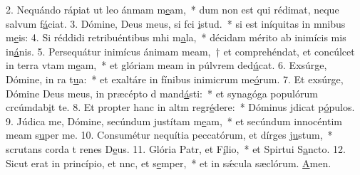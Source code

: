 2. Nequándo rápiat ut leo ánmam m\uline{e}am,~* dum non est qui rédimat, neque  salvum f\uline{á}ciat.
3. Dómine, Deus meus, si fci \uline{i}stud.~* si est iníquitas in mnibus m\uline{e}is:
4. Si réddidi retribuéntibus mhi m\uline{a}la,~* décidam mérito ab inimícis mis in\uline{á}nis.
5. Persequátur inimícus ánimam meam,~† et comprehéndat, et concúlcet in terra vtam m\uline{e}am,~* et glóriam meam in púlvrem ded\uline{ú}cat.
6. Exsúrge, Dómine, in ra t\uline{u}a:~* et exaltáre in fínibus inimicrum me\uline{ó}rum.
7. Et exsúrge, Dómine Deus meus, in præcépto d mand\uline{á}sti:~* et synagóga populórum crcúmdab\uline{i}t te.
8. Et propter hanc in altm regr\uline{é}dere:~* Dóminus jdicat p\uline{ó}pulos.
9. Júdica me, Dómine, secúndum justítam m\uline{e}am,~* et secúndum innocéntim meam s\uline{u}per me.
10. Consumétur nequítia peccatórum, et dírges j\uline{u}stum,~* scrutans corda t renes D\uline{e}us.
11. Glória Patr, et F\uline{í}lio,~* et Spirtui S\uline{a}ncto.
12. Sicut erat in princípio, et nnc, et s\uline{e}mper,~* et in sǽcula sæclórum. \uline{A}men.
